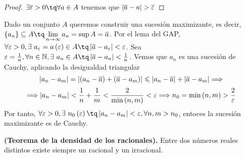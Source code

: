 {\begin{proof}
    $\exists\overline{\epsilon} > 0 \tq \forall a\in A$ tenemos que $\left\vert \overline{a} - a \right\vert > \overline{\varepsilon}$
\end{proof}

Dado un conjunto $A$ queremos construir una sucesión maximizante, es decir, $\{a_n\}\subseteq A \tq \lim_{n\to\infty}a_n = \sup A = \overline{a}$. Por el lema del GAP, $\forall\epsilon > 0, \exists\ a_\epsilon = a\left( \epsilon \right) \in A\tq \abs{\overline{a} - a_\epsilon} < \epsilon$. Sea $\epsilon = \frac{1}{n}, \forall n\in\N, \exists\ a_n\in A\tq \abs{\overline{a} - a_n} < \frac{1}{n}$. Vemos que $a_n$ es una sucesión de Cauchy, aplicando la desigualdad triangular
\begin{equation}
    \left\vert a_n - a_m \right\vert = \left\vert \left( a_n - \overline{a} \right)  + \left( \overline{a} - a_m \right)  \right\vert\leqslant \left\vert a_n - \overline{a} \right\vert + \left\vert \overline{a} - a_m \right\vert \Longrightarrow
\end{equation}
\begin{equation}
    \Longrightarrow \left\vert a_n - a_m \right\vert < \frac{1}{n} + \frac{1}{m} < \frac{2}{\min\left( n, m \right) } < \varepsilon \Longrightarrow n_0 = \min\left( n, m \right) > \frac{2}{\varepsilon}
\end{equation}
Por tanto, $\forall\epsilon > 0, \exists\ n_0\left( \epsilon \right) \tq \abs{a_n - a_m} < \epsilon, \forall n, m > n_0$, entoces la sucesión maximizante es de Cauchy.

\begin{theorem}
    \textbf{(Teorema de la densidad de los racionales).} Entre dos números reales distintos existe siempre un racional y un irracional.
\end{theorem}
}
